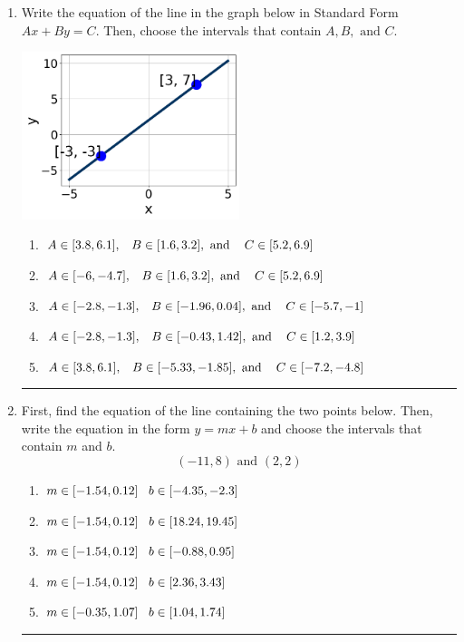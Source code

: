 \documentclass[14pt]{extbook}
\newcommand{\litem}[1]{\item#1\hspace*{-1cm}\rule{\textwidth}{0.4pt}}
\begin{document}
\begin{enumerate}
{\begin{enumerate}[label=\Alph*.]
\end{enumerate} }
\litem{
Write the equation of the line in the graph below in Standard Form $Ax+By=C$. Then, choose the intervals that contain $A, B, \text{ and } C$.
\begin{center}
    \includegraphics[width=0.5\textwidth]{../Figures/linearGraphToStandardCopyB.png}
\end{center}
\begin{enumerate}[label=\Alph*.]
\item \( A \in [3.8, 6.1], \hspace{3mm} B \in [1.6, 3.2], \text{ and } \hspace{3mm} C \in [5.2, 6.9] \)
\item \( A \in [-6, -4.7], \hspace{3mm} B \in [1.6, 3.2], \text{ and } \hspace{3mm} C \in [5.2, 6.9] \)
\item \( A \in [-2.8, -1.3], \hspace{3mm} B \in [-1.96, 0.04], \text{ and } \hspace{3mm} C \in [-5.7, -1] \)
\item \( A \in [-2.8, -1.3], \hspace{3mm} B \in [-0.43, 1.42], \text{ and } \hspace{3mm} C \in [1.2, 3.9] \)
\item \( A \in [3.8, 6.1], \hspace{3mm} B \in [-5.33, -1.85], \text{ and } \hspace{3mm} C \in [-7.2, -4.8] \)

\end{enumerate} }
\litem{
First, find the equation of the line containing the two points below. Then, write the equation in the form $ y=mx+b $ and choose the intervals that contain $m$ and $b$.\[ (-11, 8) \text{ and } (2, 2) \]\begin{enumerate}[label=\Alph*.]
\item \( m \in [-1.54, 0.12] \hspace*{3mm} b \in [-4.35, -2.3] \)
\item \( m \in [-1.54, 0.12] \hspace*{3mm} b \in [18.24, 19.45] \)
\item \( m \in [-1.54, 0.12] \hspace*{3mm} b \in [-0.88, 0.95] \)
\item \( m \in [-1.54, 0.12] \hspace*{3mm} b \in [2.36, 3.43] \)
\item \( m \in [-0.35, 1.07] \hspace*{3mm} b \in [1.04, 1.74] \)


\end{enumerate}}
\end{enumerate}
\end{document}
